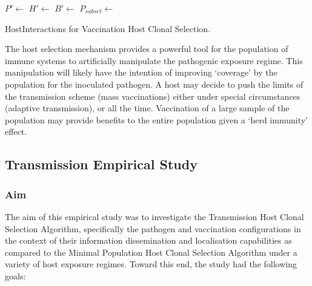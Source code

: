 \begin{algorithm}[htp]
  \SetLine  
  
    
	{
		$P\prime \leftarrow$ \SelectAllExposedHosts{\Pop}\;
		$H\prime \leftarrow$ \;
		$B\prime \leftarrow$ \;
		$P_{subset} \leftarrow$ \;
		{
			\;
		}
	}
	\caption{HostInteractions for Vaccination Host Clonal Selection.}
	\label{alg:hosts:algorithms:vthcsa:subset}
\end{algorithm}

The host selection mechanism provides a powerful tool for the population of immune systems to artificially manipulate the pathogenic exposure regime. This manipulation will likely have the intention of improving `coverage' by the population for the inoculated pathogen. A host may decide to push the limits of the transmission scheme (mass vaccinations) either under special circumstances (adaptive transmission), or all the time. Vaccination of a large sample of the population may provide benefits to the entire population given a `herd immunity' effect. 

%
%
\subsection{Transmission Empirical Study}
\label{sec:hosts:population:elicited:study}
%
%
\subsubsection{Aim}
The aim of this empirical study was to investigate the Transmission Host Clonal Selection Algorithm, specifically the pathogen and vaccination configurations in the context of their information dissemination and localisation capabilities as compared to the Minimal Population Host Clonal Selection Algorithm under a variety of host exposure regimes. Toward this end, the study had the following goals:

